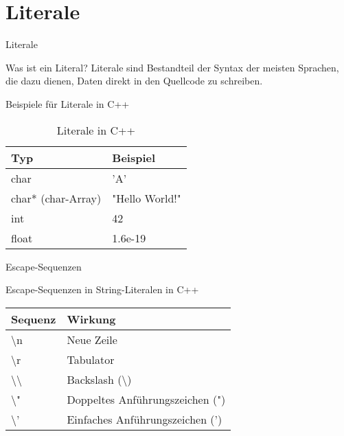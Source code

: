 \section{Literale}
\begin{frame}{Literale}
    \begin{block}{Was ist ein Literal?}
    Literale sind Bestandteil der Syntax der meisten Sprachen, die dazu dienen, Daten direkt in den Quellcode zu schreiben.
    \end{block}
    \pause
    \begin{block}{Beispiele für Literale in C++}
    \begin{table}
    \center
    \begin{tabular}{ll}
        \toprule
        Typ & Beispiel \\
        \midrule
        char & 'A' \\
        char* (char-Array) & "Hello World!" \\
        int & 42 \\
        float & 1.6e-19 \\
        \bottomrule
    \end{tabular}
    \caption{Literale in C++}
    \end{table}
    \end{block}
\end{frame}

\begin{frame}{Escape-Sequenzen}
    \begin{block}{Escape-Sequenzen in String-Literalen in C++}
    \begin{table}
    \center
    \begin{tabular}{ll}
        \toprule
        Sequenz & Wirkung \\
        \midrule
        \textbackslash n & Neue Zeile \\
        \textbackslash r & Tabulator \\
        \textbackslash\textbackslash & Backslash (\textbackslash) \\
        \textbackslash" & Doppeltes Anführungszeichen (") \\
        \textbackslash' & Einfaches Anführungszeichen (') \\
        \bottomrule
    \end{tabular}
    \end{table}
    \end{block}
\end{frame}

